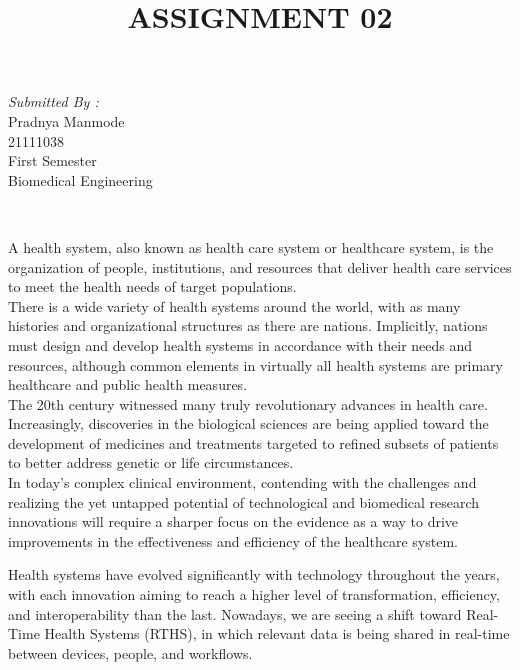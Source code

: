 \documentclass[12pt]{article}
\begin{document}
\begin{titlepage}
\begin{minipage}{0.4\textwidth}
			\begin{flushright} \large
			\emph{Submitted By :} \\
			Pradnya Manmode\\
            21111038\\
        First Semester\\
        Biomedical Engineering\\
		\end{flushright}
        
	\end{minipage}\\[2 cm]
	
	
    
    
    
    
	
\end{titlepage}


\title{ASSIGNMENT 02}
\maketitle

\indent

A health system, also known as health care system or healthcare system, is the organization of people, institutions, and resources that deliver health care services to meet the health needs of target populations.
\\
There is a wide variety of health systems around the world, with as many histories and organizational structures as there are nations. Implicitly, nations must design and develop health systems in accordance with their needs and resources, although common elements in virtually all health systems are primary healthcare and public health measures. 
\\
The 20th century witnessed many truly revolutionary advances in health care. Increasingly, discoveries in the biological sciences are being applied toward the development of medicines and treatments targeted to refined subsets of patients to better address genetic or life circumstances.
\\

In today’s complex clinical environment, contending with the challenges and realizing the yet untapped potential of technological and biomedical research innovations will require a sharper focus on the evidence as a way to drive improvements in the effectiveness and efficiency of the healthcare system. 

\indent
Health systems have evolved significantly with technology throughout the years, with each innovation aiming to reach a higher level of transformation, efficiency, and interoperability than the last. Nowadays, we are seeing a shift toward Real-Time Health Systems (RTHS), in which relevant data is being shared in real-time between devices, people, and workflows.
\end{document}
